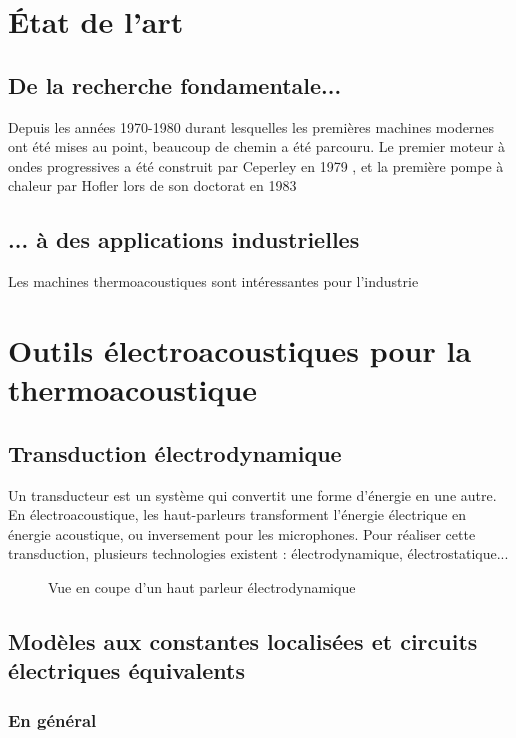 \section{\'Etat de l'art}
\subsection{De la recherche fondamentale...}
Depuis les années 1970-1980 durant lesquelles les premières machines modernes ont été mises au point, beaucoup de chemin a été parcouru. Le premier moteur à ondes progressives a été construit par Ceperley en 1979 \cite{ceperley_pistonless_1979}, et la première pompe à chaleur par Hofler lors de son doctorat en 1983 

\subsection{... à des applications industrielles}
Les machines thermoacoustiques sont intéressantes pour l'industrie 

\section{Outils électroacoustiques pour la thermoacoustique}
\subsection{Transduction électrodynamique}
Un transducteur est un système qui convertit une forme d'énergie en une autre. En électroacoustique, les haut-parleurs transforment l'énergie électrique en énergie acoustique, ou inversement pour les microphones. Pour réaliser cette transduction, plusieurs technologies existent : électrodynamique, électrostatique...

\begin{figure}[!ht]
    \centering
    
    \caption{Vue en coupe d'un haut parleur électrodynamique}
    \label{fig:HautParleur}
\end{figure}

\subsection{Modèles aux constantes localisées et circuits électriques équivalents}

\subsubsection{En général}

